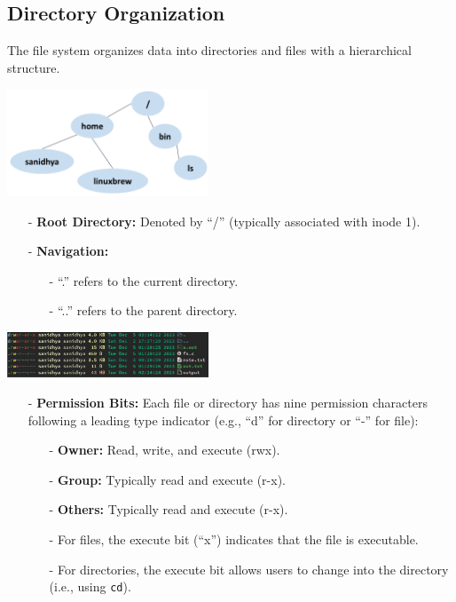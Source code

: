 \subsection{Directory Organization}
The file system organizes data into directories and files with a hierarchical structure. 
\begin{center}
  \includegraphics[width=0.45\textwidth]{chapters/L6/images/file-tree.png}
\end{center}
\begin{itemize}
  \item[-] \textbf{Root Directory:} Denoted by ``/'' (typically associated with inode 1).
  \item[-] \textbf{Navigation:}
    \begin{itemize}
      \item[-] ``.'' refers to the current directory.
      \item[-] ``..'' refers to the parent directory.
    \end{itemize}
\end{itemize}
\begin{center}
  \includegraphics[width=0.45\textwidth]{chapters/L6/images/permissions.png}
\end{center}
\begin{itemize}
  \item[-] \textbf{Permission Bits:} Each file or directory has nine permission characters following a leading type indicator (e.g., ``d'' for directory or ``-'' for file):
    \begin{itemize}
      \item[-] \textbf{Owner:} Read, write, and execute (rwx).
      \item[-] \textbf{Group:} Typically read and execute (r-x).
      \item[-] \textbf{Others:} Typically read and execute (r-x).
    \end{itemize}
    \begin{itemize}
      \item[-] For files, the execute bit (``x'') indicates that the file is executable.
      \item[-] For directories, the execute bit allows users to change into the directory (i.e., using \texttt{cd}).
    \end{itemize}
\end{itemize}




